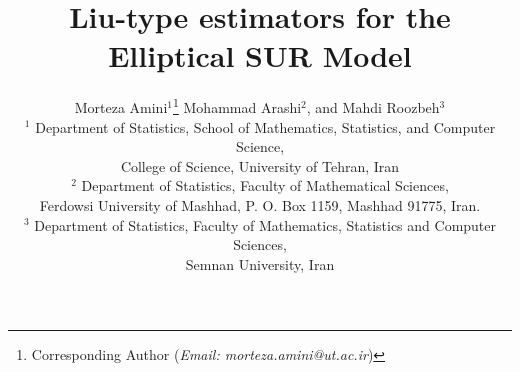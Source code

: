 \documentclass{article}
\begin{document}
\def\theequation{\arabic{section}.\arabic{equation}}
\setcounter{page}{1}
\newcommand{\bb}{\boldsymbol{\beta}}
\newcommand{\bh}{\boldsymbol{\hat{\beta}}}
\newcommand{\by}{\widetilde{\boldsymbol{y}}}
\newcommand{\Y}{\widetilde{\boldsymbol{Y}}}
\newcommand{\bX}{\widetilde{\boldsymbol{X}}}
\newcommand{\be}{\boldsymbol{\widetilde{\epsilon}}}
\newcommand{\0}{\boldsymbol{0}}
\newcommand{\bth}{\boldsymbol{\hat{\theta}}}
\newcommand{\bt}{\boldsymbol{\theta}}
\newcommand{\bT}{\boldsymbol{T}}
\newcommand{\bF}{\boldsymbol{F}}
\newcommand{\D}{\boldsymbol{D}}
\newcommand{\bR}{\boldsymbol{R}}
\newcommand{\br}{\boldsymbol{r}}
\newcommand{\bS}{\boldsymbol{S}}
\newcommand{\bM}{\boldsymbol{M}}
\newcommand{\bN}{\boldsymbol{N}}
\newcommand{\bI}{\boldsymbol{I}}
\newcommand{\V}{\boldsymbol{V}}
\newcommand{\K}{\boldsymbol{K}}
\newcommand{\VD}{\boldsymbol{V_D}}
\newcommand{\bD}{\boldsymbol{\hat{b}}_{\boldsymbol{D}}}
\newcommand{\bRD}{\boldsymbol{\hat{b}}_{\boldsymbol{RD}}}
\newcommand{\bGD}{\boldsymbol{\hat{b}}_{G\boldsymbol{D}}}
\newcommand{\bGRD}{\boldsymbol{\hat{b}}_{G\boldsymbol{RD}}}
\newcommand{\CD}{\boldsymbol{C_D}}
\newcommand{\MD}{\boldsymbol{M_D}}
\newcommand{\ND}{\boldsymbol{N_D}}
\newcommand{\Q}{\boldsymbol{Q}}
\newcommand{\ba}{\boldsymbol{a}}
\newcommand{\bY}{\boldsymbol{Y}}
\newcommand{\bx}{\boldsymbol{x}}
\newcommand{\bA}{\boldsymbol{A}}
\newcommand{\bG}{\boldsymbol{G}}
\newcommand{\bC}{\boldsymbol{C}}
\newcommand{\bH}{\boldsymbol{H}}
\newcommand{\bP}{\boldsymbol{P}}
\newcommand{\bs}{\sigma}
\newcommand{\bet}{\boldsymbol{\eta}}
\newcommand{\bPh}{\boldsymbol{\Phi}}
\newcommand{\bd}{\boldsymbol{\delta}}
\newcommand{\W}{\mathcal{W}}
\newcommand{\A}{\mathcal{A}}
\newcommand{\B}{\mathcal{B}}
\newcommand{\E}{\mathcal{E}}
\newcommand{\N}{\mathcal{N}}
\newcommand{\beq}{\begin{eqnarray}}
\newcommand{\eeq}{\end{eqnarray}}
\newtheorem{thm}{Theorem}[section]
\newtheorem{cor}{Corollary}[section]
\newtheorem{lem}{Lemma}[section]
\newtheorem{rem}{Remark}[section]
\newtheorem{prop}{Proposition}[section]
	
\title{\bf{Liu-type estimators for the Elliptical SUR Model}}
\author{Morteza Amini$^1$\footnote{Corresponding Author ({\em Email: morteza.amini@ut.ac.ir})} Mohammad Arashi$^2$, and Mahdi Roozbeh$^3$\\
\small{$^{1}$ Department of Statistics, School of Mathematics, Statistics, and Computer Science,}\\
\small{College of Science, University of Tehran, Iran}\\
\small{$^{2}$ Department of Statistics, Faculty of Mathematical Sciences,}\\
\small{Ferdowsi University of Mashhad, P. O. Box 1159, Mashhad 91775, Iran.}\\
\small{$^{3}$ Department of Statistics, Faculty of Mathematics, Statistics and Computer Sciences,}\\
\small{Semnan University, Iran}
}
\end{document}
